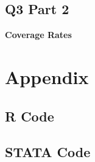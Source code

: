 \documentclass[11pt]{article}
\begin{document}
\subsection{Q3 Part 2}

\begin{center}
	
	\centering
	
	\textbf{Coverage Rates }\par\medskip
	\scalebox{0.85}{
		
	}
\end{center}

\section{Appendix}
\subsection{R Code}



\subsection{STATA Code}


\end{document}
